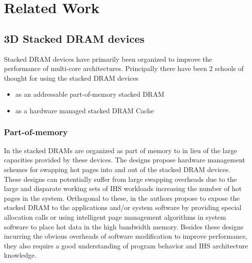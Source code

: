 \chapter{Related Work} \label{related-work}
\section{3D Stacked DRAM devices}
Stacked DRAM devices have primarily been organized to improve the performance of multi-core architectures. Principally there have been 2 schools of thought for using the stacked DRAM devices 
\begin{itemize}
	\item as an addressable part-of-memory stacked DRAM 
	\item as a hardware managed stacked DRAM Cache
\end{itemize}
\subsection{Part-of-memory}
In \cite{pom,cameo} the stacked DRAMs are organized as part of memory to in lieu of the large capacities provided by these devices. The designs propose hardware management schemes for swapping hot pages into and out of the stacked DRAM devices. These designs can potentially suffer from large swapping overheads due to the large and disparate working sets of IHS workloads increasing the number of hot pages in the system. Orthogonal to these, in \cite{software-dram} the authors propose to expose the stacked DRAM to the applications and/or system software by providing special allocation calls or using intelligent page management algorithms in system software to place hot data in the high bandwidth memory. Besides these designs incurring the obvious overheads of software modification to improve performance, they also require a good understanding of program behavior and IHS architecture knowledge.

